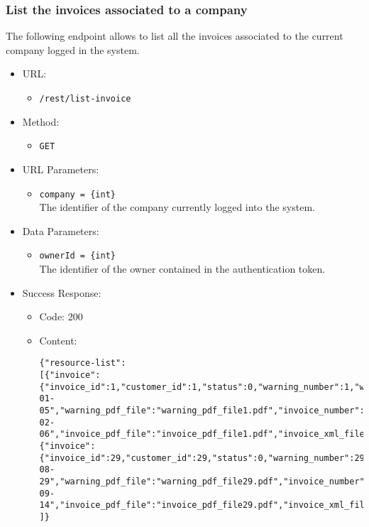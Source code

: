 


\subsubsection*{List the invoices associated to a company}

The following endpoint allows to list all the invoices associated to the current company logged in the system.

\begin{itemize}
    
    \item URL: 
    \begin{itemize}
        \item \texttt{/rest/list-invoice}
    \end{itemize}
    
    \item Method: 
    \begin{itemize}
        \item \texttt{GET}
    \end{itemize}
    
    \item URL Parameters: 
    \begin{itemize}
        \item \texttt{company = \{int\}} \\
        The identifier of the company currently logged into the system.
    \end{itemize}
    
    \item Data Parameters: 
    \begin{itemize}
        \item \texttt{ownerId = \{int\}} \\
        The identifier of the owner contained in the authentication token.
    \end{itemize}
    
    \item Success Response: 
    \begin{itemize}
        \item Code: 200
        \item Content:
        \begin{lstlisting}
{"resource-list":
[{"invoice":{"invoice_id":1,"customer_id":1,"status":0,"warning_number":1,"warning_date":"2022-01-05","warning_pdf_file":"warning_pdf_file1.pdf","invoice_number":"1","invoice_date":"2022-02-06","invoice_pdf_file":"invoice_pdf_file1.pdf","invoice_xml_file":"invoice_xml_file1.xml","total":168.3,"discount":15.0,"pension_fund_refund":4.1,"has_stamp":false}},
{"invoice":{"invoice_id":29,"customer_id":29,"status":0,"warning_number":29,"warning_date":"2022-08-29","warning_pdf_file":"warning_pdf_file29.pdf","invoice_number":"29","invoice_date":"2022-09-14","invoice_pdf_file":"invoice_pdf_file29.pdf","invoice_xml_file":"invoice_xml_file29.xml","total":846.8,"discount":75.4,"pension_fund_refund":1.2,"has_stamp":false}}
]}
        \end{lstlisting}    
    \end{itemize}
    

\end{itemize}
